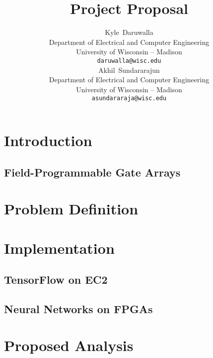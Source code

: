 \documentclass{article}
\title{Project Proposal}
\author{
    Kyle~Daruwalla \\
    Department of Electrical and Computer Engineering \\
    University of Wisconsin -- Madison \\
    \texttt{daruwalla@wisc.edu} \\
    \And
    Akhil~Sundararajun \\
    Department of Electrical and Computer Engineering \\
    University of Wisconsin -- Madison \\
    \texttt{asundararaja@wisc.edu} \\
}
\begin{document}
\maketitle


\begin{abstract}
    
\end{abstract}

\section{Introduction}

\subsection{Field-Programmable Gate Arrays}


\section{Problem Definition}


\section{Implementation}

\subsection{TensorFlow on EC2}

\subsection{Neural Networks on FPGAs}


\section{Proposed Analysis}


\nocite{*}

\end{document}
